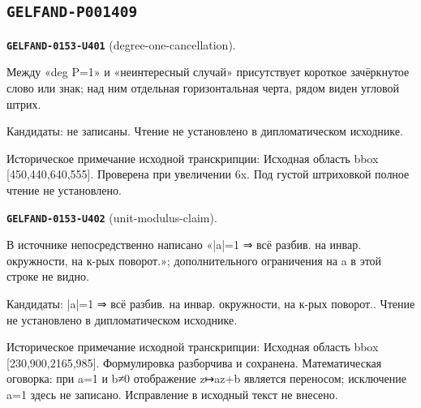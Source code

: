 \subsection*{\texttt{GELFAND-P001409}}
\par\noindent\leavevmode{}\label{GELFAND-0153-U401}\textbf{\texttt{GELFAND-0153-U401}} (degree-one-cancellation).\nopagebreak[4]\par
Между «deg P=1» и «неинтересный случай» присутствует короткое зачёркнутое слово или знак; над ним отдельная горизонтальная черта, рядом виден угловой штрих.\par
Кандидаты: не записаны. Чтение не установлено в дипломатическом исходнике.\par
Историческое примечание исходной транскрипции: Исходная область bbox [450,440,640,555]. Проверена при увеличении 6x. Под густой штриховкой полное чтение не установлено.\par\medskip
\par\noindent\leavevmode{}\label{GELFAND-0153-U402}\textbf{\texttt{GELFAND-0153-U402}} (unit-modulus-claim).\nopagebreak[4]\par
В источнике непосредственно написано «|a|=1 ⇒ всё разбив. на инвар. окружности, на к-рых поворот.»; дополнительного ограничения на a в этой строке не видно.\par
Кандидаты: |a|=1 ⇒ всё разбив. на инвар. окружности, на к-рых поворот.. Чтение не установлено в дипломатическом исходнике.\par
Историческое примечание исходной транскрипции: Исходная область bbox [230,900,2165,985]. Формулировка разборчива и сохранена. Математическая оговорка: при a=1 и b≠0 отображение z↦az+b является переносом; исключение a=1 здесь не записано. Исправление в исходный текст не внесено.\par\medskip

